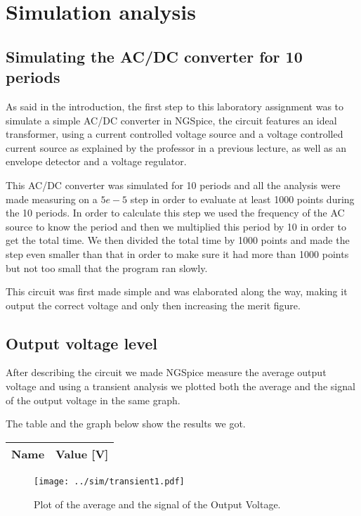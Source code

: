 \section{Simulation analysis}
\label{sec:simulation}

\subsection{Simulating the AC/DC converter for 10 periods}
As said in the introduction, the first step to this laboratory assignment was to simulate a simple AC/DC converter in NGSpice, the circuit features an ideal transformer, using a current controlled voltage source and a voltage controlled current source as explained by the professor in a previous lecture, as well as an envelope detector and a voltage regulator. \par
This AC/DC converter was simulated for 10 periods and all the analysis were made measuring on a $5e-5$ step in order to evaluate at least 1000 points during the 10 periods. In order to calculate this step we used the frequency of the AC source to know the period and then we multiplied this period by 10 in order to get the total time. We then divided the total time by 1000 points and made the step even smaller than that in order to make sure it had more than 1000 points but not too small that the program ran slowly. \par
This circuit was first made simple and was elaborated along the way, making it output the correct voltage and only then increasing the merit figure.

\subsection{Output voltage level}
After describing the circuit we made NGSpice measure the average output voltage and using a transient analysis we plotted both the average and the signal of the output voltage in the same graph. \par
The table and the graph below show the results we got.

\begin{table}[H]
  \centering
  \begin{tabular}{|l|r|}
    \hline    
    {\bf Name} & {\bf Value [V]} \\ \hline
    
  \end{tabular}
  \label{tab:average}
\end{table}

\begin{figure}[H] \centering
\texttt{[image: ../sim/transient1.pdf]}
\caption{Plot of the average and the signal of the Output Voltage.}
\label{fig:transient1}
\end{figure}

